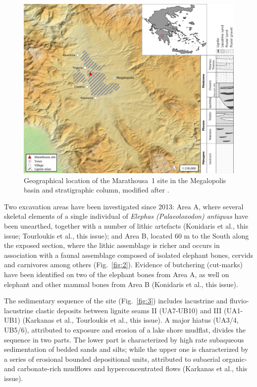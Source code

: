 \documentclass[preprint,authoryear,times]{elsarticle} %
\begin{document}
\begin{figure}[]
  \centering
  \includegraphics[width=1\textwidth]{../artwork/Fig1.png} %
  \caption{Geographical location of the Marathousa~1 site in the Megalopolis basin and stratigraphic column, modified after \cite{Vugt2000}.}
  \label{fig:1}
\end{figure}

Two excavation areas have been investigated since 2013: Area A, where several skeletal elements of a single individual of \emph{Elephas (Palaeoloxodon) antiquus} have been unearthed, together with a number of lithic artefacts (Konidaris et al., this issue; Tourloukis et al., this issue); and Area B, located 60 m to the South along the exposed section, where the lithic assemblage is richer and occurs in association with a faunal assemblage composed of isolated elephant bones, cervids and carnivores among others (Fig.~\ref{fig:2}). Evidence of butchering (cut-marks) have been identified on two of the elephant bones from Area A, as well on elephant and other mammal bones from Area B (Konidaris et al., this issue).


The sedimentary sequence of the site (Fig.~\ref{fig:3}) includes lacustrine and fluvio-lacustrine clastic deposits between lignite seams II (UA7-UB10) and III (UA1-UB1) (Karkanas et al., Tourloukis et al., this issue). A major hiatus (UA3/4, UB5/6), attributed to exposure and erosion of a lake shore mudflat, divides the sequence in two parts. The lower part is characterized by high rate subaqueous sedimentation of bedded sands and silts; while the upper one is characterized by a series of erosional bounded depositional units, attributed to subaerial organic- and carbonate-rich mudflows and hyperconcentrated flows (Karkanas et al., this issue).
\end{document}
